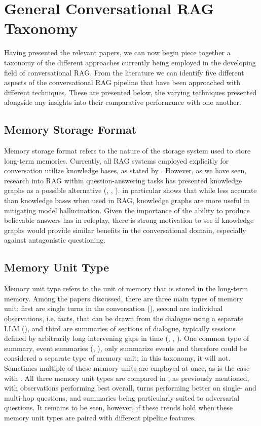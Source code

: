 \section{General Conversational RAG Taxonomy}

Having presented the relevant papers, we can now begin piece together a taxonomy of the different approaches currently being employed in the developing field of conversational RAG. From the literature we can identify five different aspects of the conversational RAG pipeline that have been approached with different techniques. These are presented below, the varying techniques presented alongside any insights into their comparative performance with one another.


\subsection{Memory Storage Format}

Memory storage format refers to the nature of the storage system used to store long-term memories. Currently, all RAG systems employed explicitly for conversation utilize knowledge bases, as stated by \cite{Hatalis2024}. However, as we have seen, research into RAG within question-answering tasks has presented knowledge graphs as a possible alternative (\cite{Sanmartin2024}, \cite{Guan2023}, \cite{Yang2024}). \cite{Sanmartin2024} in particular shows that while less accurate than knowledge bases when used in RAG, knowledge graphs are more useful in mitigating model hallucination. Given the importance of the ability to produce believable answers has in roleplay, there is strong motivation to see if knowledge graphs would provide similar benefits in the conversational domain, especially against antagonistic questioning.


\subsection{Memory Unit Type}

Memory unit type refers to the unit of memory that is stored in the long-term memory. Among the papers discussed, there are three main types of memory unit: first are single turns in the conversation (\cite{Park2023}), second are individual observations, i.e. facts, that can be drawn from the dialogue using a separate LLM (\cite{Maharana2024}), and third are summaries of sections of dialogue, typically sessions defined by arbitrarily long intervening gaps in time (\cite{Maharana2024}, \cite{Zhong2023}, \cite{Li2024}). One common type of summary, event summaries (\cite{Zhong2023}, \cite{Li2024}), only summarize events and therefore could be considered a separate type of memory unit; in this taxonomy, it will not. Sometimes multiple of these memory units are employed at once, as is the case with \cite{Zhong2023}. All three memory unit types are compared in \cite{Maharana2024}, as previously mentioned, with observations performing best overall, turns performing better on single- and multi-hop questions, and summaries being particularly suited to adversarial questions. It remains to be seen, however, if these trends hold when these memory unit types are paired with different pipeline features.


